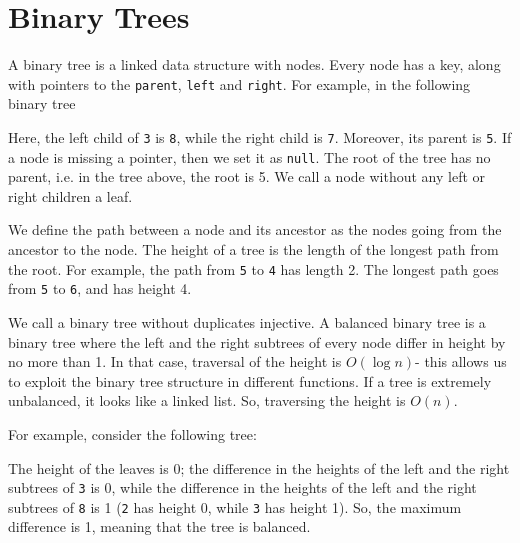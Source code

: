 \documentclass[a4paper, openany]{memoir}
\begin{document}
\section{Binary Trees}
A binary tree is a linked data structure with nodes. Every node has a key, along with pointers to the \texttt{parent}, \texttt{left} and \texttt{right}. For example, in the following binary tree
\begin{center}
\end{center}
Here, the left child of \texttt{3} is \texttt{8}, while the right child is \texttt{7}. Moreover, its parent is \texttt{5}. If a node is missing a pointer, then we set it as \texttt{null}. The root of the tree has no parent, i.e. in the tree above, the root is 5. We call a node without any left or right children a leaf.

\noindent We define the path between a node and its ancestor as the nodes going from the ancestor to the node. The height of a tree is the length of the longest path from the root. For example, the path from \texttt{5} to \texttt{4} has length 2. The longest path goes from \texttt{5} to \texttt{6}, and has height 4.

\noindent We call a binary tree without duplicates injective. A balanced binary tree is a binary tree where the left and the right subtrees of every node differ in height by no more than 1. In that case, traversal of the height is $O(\log n)$- this allows us to exploit the binary tree structure in different functions. If a tree is extremely unbalanced, it looks like a linked list. So, traversing the height is $O(n)$.

\noindent For example, consider the following tree:
\begin{center}
\end{center}
The height of the leaves is 0; the difference in the heights of the left and the right subtrees of \texttt{3} is 0, while the difference in the heights of the left and the right subtrees of \texttt{8} is 1 (\texttt{2} has height 0, while \texttt{3} has height 1). So, the maximum difference is 1, meaning that the tree is balanced.
\end{document}
